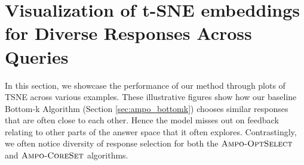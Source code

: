 \clearpage
\section{Visualization of t-SNE embeddings for Diverse Responses Across Queries}
\label{sec:tsne_visualization}

In this section, we showcase the performance of our method through plots of TSNE across various examples. These illustrative figures show how our baseline Bottom-k Algorithm (Section \ref{sec:ampo_bottomk}) chooses similar responses that are often close to each other. Hence the model misses out on feedback relating to other parts of the answer space that it often explores. Contrastingly, we often notice diversity of response selection for both the $\textsc{Ampo-OptSelect}$ and $\textsc{Ampo-CoreSet}$ algorithms.





